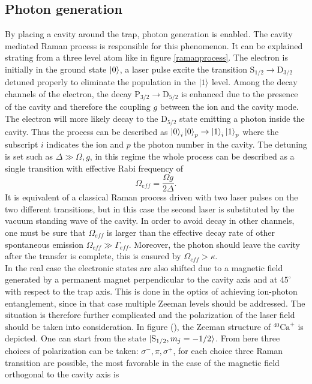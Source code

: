 \subsection{Photon generation}
\label{sec:ramanprocess}
By placing a cavity around the trap, photon generation is enabled. The cavity mediated Raman process is responsible for this phenomenon. It can be explained strating from a three level atom like in figure \ref{ramanprocess}. The electron is initially in the ground state $\ket{0}$, a laser pulse excite the transition $\text{S}_{1/2} \to \text{D}_{3/2}$ detuned properly to eliminate the population in the $\ket{1}$ level. Among the decay channels of the electron, the decay $\text{P}_{3/2} \to \text{D}_{5/2}$ is enhanced due to the presence of the cavity and therefore the coupling $g$ between the ion and the cavity mode. The electron will more likely decay
to the $\text{D}_{5/2}$ state emitting a photon inside the cavity. Thus the process can be described as $\ket{0}_i\ket{0}_p \to \ket{1}_i\ket{1}_p$ where the subscript $i$ indicates the ion and $p$ the photon number in the cavity. The detuning is set such as $\Delta \gg \Omega,g$, in this regime the whole process can be described as a single transition with effective Rabi frequency of \cite{helene}
\begin{equation}
\Omega_{eff} = \frac{\Omega g}{2\Delta}.
\end{equation}
It is equivalent of a classical Raman process driven with two laser pulses on the two different transitions, but in this case the second laser is substituted by the vacuum standing wave of the cavity. In order to avoid decay in other channels, one must be sure that $\Omega_{eff}$ is larger than the effective decay rate of other spontaneous emission $\Omega_{eff}\gg \Gamma_{eff}$. Moreover, the photon should leave the cavity after the transfer is complete, this is ensured by $\Omega_{eff} >\kappa$.\\
In the real case the electronic states are also shifted due to a magnetic field generated by a permanent magnet perpendicular to the cavity axis and at $45^{\circ}$ with respect to the trap axis. This is done in the optics of achieving ion-photon entanglement, since in that case multiple Zeeman levels should be addressed. The situation is therefore further complicated and the polarization of the laser field should be taken into consideration. In figure (), the Zeeman structure of $^{40}\text{Ca}^+$ is depicted. One can start from the state $\ket{\text{S}_{1/2},m_j = -1/2}$. From here three choices of polarization can be taken: $\sigma^-,\pi,\sigma^+$, for each choice three Raman transition are possible, the most favorable in the case of the magnetic field orthogonal to the cavity axis is \cite{stuteinterface}

